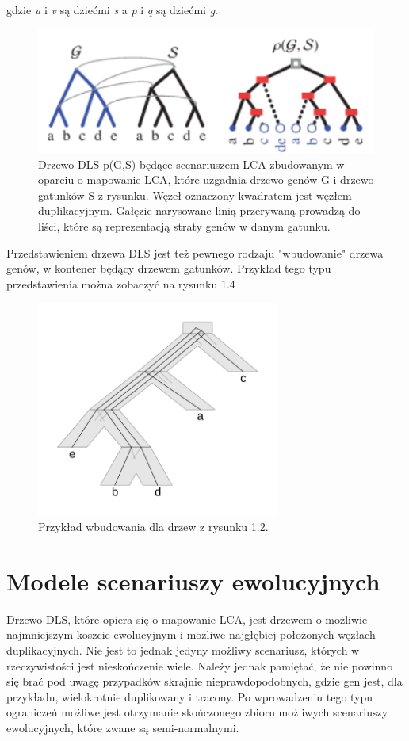 \documentclass[licencjacka]{pracamgr}
\begin{document}
gdzie \textit{u} i \textit{v} są dziećmi \textit{s} a \textit{p} i \textit{q} są dziećmi \textit{g}. 
\begin{figure}[H]
  \centering
  \includegraphics[width=120mm]{./pictures/DLS.png}
  \caption{Drzewo DLS p(G,S) będące scenariuszem LCA zbudowanym w oparciu o mapowanie LCA, które uzgadnia drzewo genów G i drzewo gatunków S z rysunku. Węzeł oznaczony kwadratem jest węzłem duplikacyjnym. Gałęzie narysowane linią przerywaną prowadzą do liści, które są reprezentacją straty genów w danym gatunku.}
\end{figure}

Przedstawieniem drzewa DLS jest też pewnego rodzaju "wbudowanie" drzewa genów, w kontener będący drzewem gatunków. Przykład tego typu przedstawienia można zobaczyć na rysunku 1.4 


\begin{figure}[H]
  \centering
  \includegraphics[width=80mm]{./pictures/optscen.png}
  \caption{Przykład wbudowania dla drzew z rysunku 1.2.}
\end{figure}


\section{Modele scenariuszy ewolucyjnych}

Drzewo DLS, które opiera się o mapowanie LCA, jest drzewem o możliwie najmniejszym koszcie ewolucyjnym i możliwe najgłębiej położonych węzłach duplikacyjnych. Nie jest to jednak jedyny możliwy scenariusz, których w rzeczywistości jest nieskończenie wiele. Należy jednak pamiętać, że nie powinno się brać pod uwagę przypadków skrajnie nieprawdopodobnych, gdzie gen jest, dla przykładu, wielokrotnie duplikowany i tracony. Po wprowadzeniu tego typu ograniczeń możliwe jest otrzymanie skończonego zbioru możliwych scenariuszy ewolucyjnych, które zwane są semi-normalnymi. 
\end{document}
